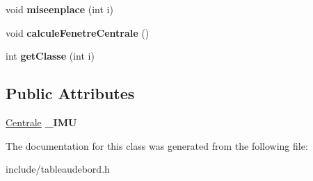 \begin{DoxyCompactItemize}
\item 
\hypertarget{class_tableau_de_bord_a4abeae4d8ac996df2c8bcfde3c4def5b}{void {\bfseries miseenplace} (int i)}\label{class_tableau_de_bord_a4abeae4d8ac996df2c8bcfde3c4def5b}

\item 
\hypertarget{class_tableau_de_bord_a6a761c60e4b9b08b7c5cf776a45dd34b}{void {\bfseries calcule\-Fenetre\-Centrale} ()}\label{class_tableau_de_bord_a6a761c60e4b9b08b7c5cf776a45dd34b}

\item 
\hypertarget{class_tableau_de_bord_a744ea1526c1e11dedbdaac19fdbccd9e}{int {\bfseries get\-Classe} (int i)}\label{class_tableau_de_bord_a744ea1526c1e11dedbdaac19fdbccd9e}

\end{DoxyCompactItemize}
\subsection*{Public Attributes}
\begin{DoxyCompactItemize}
\item 
\hypertarget{class_tableau_de_bord_a3bd57b06d7771f60fdd931e67bfd2a7b}{\hyperlink{class_centrale}{Centrale} {\bfseries \-\_\-\-I\-M\-U}}\label{class_tableau_de_bord_a3bd57b06d7771f60fdd931e67bfd2a7b}

\end{DoxyCompactItemize}


The documentation for this class was generated from the following file\-:\begin{DoxyCompactItemize}
\item 
include/tableaudebord.\-h\end{DoxyCompactItemize}
